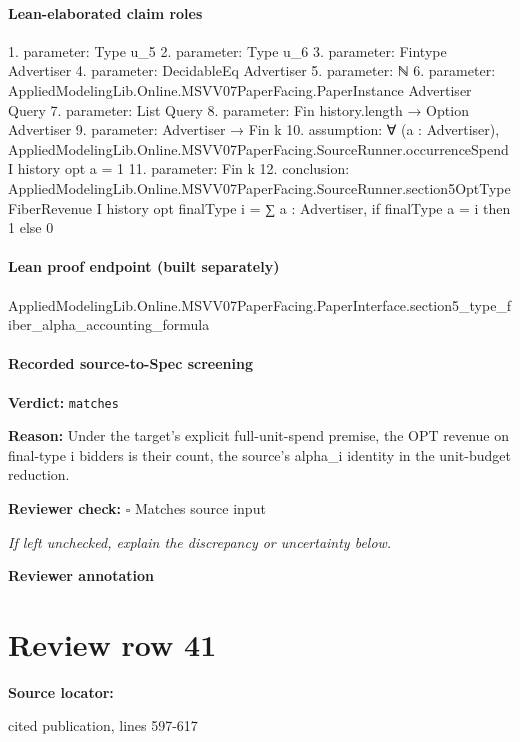 \documentclass[10pt]{article}
\newcommand{\reviewerbox}{%
  \par\noindent\fbox{\parbox{0.96\linewidth}{\rule{0pt}{0.38in}}}\par
}
\newcommand{\reviewmatch}[1]{%
  \par\noindent\textbf{Reviewer check:} $\square$\; #1\par
  \noindent\emph{If left unchecked, explain the discrepancy or uncertainty below.}\par
}
\begin{document}
\paragraph{Lean-elaborated claim roles}\begin{ReviewVerbatim}
1. parameter: Type u_5
2. parameter: Type u_6
3. parameter: Fintype Advertiser
4. parameter: DecidableEq Advertiser
5. parameter: ℕ
6. parameter: AppliedModelingLib.Online.MSVV07PaperFacing.PaperInstance Advertiser Query
7. parameter: List Query
8. parameter: Fin history.length → Option Advertiser
9. parameter: Advertiser → Fin k
10. assumption: ∀ (a : Advertiser), AppliedModelingLib.Online.MSVV07PaperFacing.SourceRunner.occurrenceSpend I history opt a = 1
11. parameter: Fin k
12. conclusion: AppliedModelingLib.Online.MSVV07PaperFacing.SourceRunner.section5OptTypeFiberRevenue I history opt finalType i =
  ∑ a : Advertiser, if finalType a = i then 1 else 0
\end{ReviewVerbatim}

\paragraph{Lean proof endpoint (built separately)}\begin{ReviewVerbatim}
AppliedModelingLib.Online.MSVV07PaperFacing.PaperInterface.section5_type_fiber_alpha_accounting_formula
\end{ReviewVerbatim}

\paragraph{Recorded source-to-Spec screening}
\textbf{Verdict:} \texttt{matches}
\\
{\raggedright
\textbf{Reason:} Under the target's explicit full-\allowbreak{}unit-\allowbreak{}spend premise, the OPT revenue on final-\allowbreak{}type i bidders is their count, the source's alpha\_\allowbreak{}i identity in the unit-\allowbreak{}budget reduction.\allowbreak{}
\par}
\reviewmatch{Matches source input}
\noindent\textbf{Reviewer annotation}\par
\reviewerbox
\clearpage
\hypertarget{source-claim-73808f65722d1521}{}
\section*{Review row 41}
\textbf{Source locator:} {\footnotesize\raggedright cited publication, lines 597-\allowbreak{}617\par}
\end{document}
